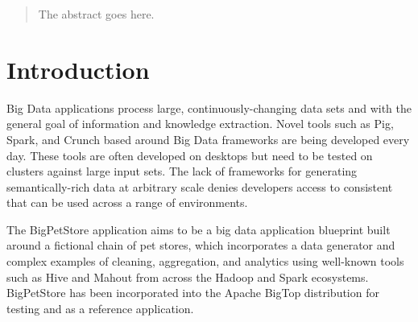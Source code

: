 \documentclass[conference]{IEEEtran}
\begin{document}
\begin{abstract}
The abstract goes here.
\end{abstract}





%
\IEEEpeerreviewmaketitle



\section{Introduction}
Big Data applications process large, continuously-changing data sets and with the general goal of information and knowledge extraction.  Novel tools such as Pig, Spark, and Crunch based around Big Data frameworks are being developed every day.  These tools are often developed on desktops but need to be tested on clusters against large input sets.  The lack of frameworks for generating semantically-rich data at arbitrary scale denies developers access to consistent that can be used across a range of environments.

The BigPetStore application aims to be a big data application blueprint built around a fictional chain of pet stores, which incorporates a data generator and complex examples of cleaning, aggregation, and analytics using well-known tools such as Hive and Mahout from across the Hadoop and Spark ecosystems. BigPetStore has been incorporated into the Apache BigTop distribution for testing and as a reference application.
\end{document}
